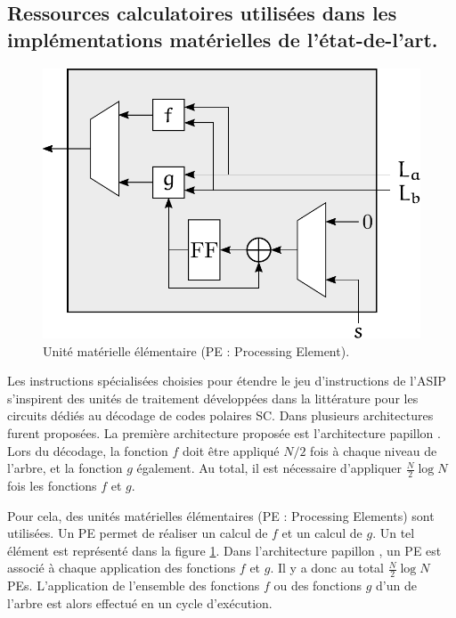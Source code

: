 \subsection{Ressources calculatoires utilisées dans les implémentations matérielles de l'état-de-l'art.}
\label{subsec:hard_sc}

\begin{figure}[t]
\centering
\includegraphics[scale=0.75]{main/ch3_fig/PE}
\caption{Unité matérielle élémentaire (PE : Processing Element).}
\label{fig:pe}
\end{figure}


Les instructions spécialisées choisies pour étendre le jeu d'instructions de l'ASIP s'inspirent des unités de traitement développées dans la littérature pour les circuits dédiés au décodage de codes polaires SC. Dans \cite{leroux_hardware_2011} plusieurs architectures furent proposées. La première architecture proposée est l'architecture \og papillon \fg. Lors du décodage, la fonction $f$ doit être appliqué $N/2$ fois à chaque niveau de l'arbre, et la fonction $g$ également. Au total, il est nécessaire d'appliquer $\frac{N}{2} \log N$ fois les fonctions $f$ et $g$. 

Pour cela, des unités matérielles élémentaires (PE : Processing Elements) sont utilisées.
Un PE permet de réaliser un calcul de $f$ et un calcul de $g$. Un tel élément est représenté dans la figure \ref{fig:pe}.
Dans l'architecture \og papillon \fg, un PE est associé à chaque application des fonctions $f$ et $g$.
Il y a donc au total $\frac{N}{2} \log N$ PEs.
L'application de l'ensemble des fonctions $f$ ou des fonctions $g$ d'un \noeud de l'arbre est alors effectué en un cycle d'exécution.


